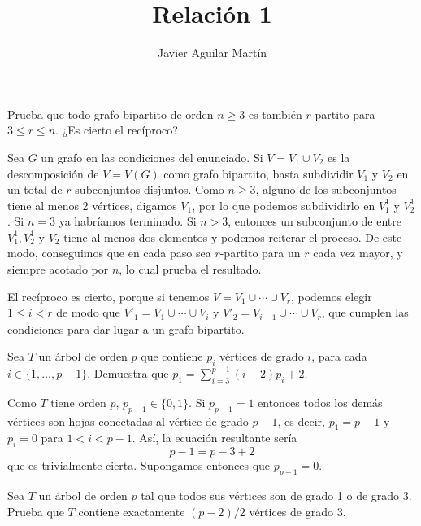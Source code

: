 \documentclass[twoside]{article}
\begin{document}
\title{Relación 1}
\author{Javier Aguilar Martín}
\maketitle


\begin{ejercicio}{1.1}
Prueba que todo grafo bipartito de orden $n \geq 3$ es también $r$-partito para $3\leq r \leq n$. ¿Es
cierto el recíproco?
\end{ejercicio}
\begin{solucion}
Sea $G$ un grafo en las condiciones del enunciado. Si $V=V_1\cup V_2$ es la descomposición de $V=V(G)$ como grafo bipartito, basta subdividir $V_1$ y $V_2$ en un total de $r$ subconjuntos disjuntos. Como $n\geq 3$, alguno de los subconjuntos tiene al menos 2 vértices, digamos $V_1$, por lo que podemos subdividirlo en $V_1^1$ y $V_2^1$. Si $n=3$ ya habríamos terminado. Si $n>3$, entonces un subconjunto de entre $V_1^1, V_2^1$ y $V_2$ tiene al menos dos elementos y podemos reiterar el proceso. De este modo, conseguimos que en cada paso sea $r$-partito para un $r$ cada vez mayor, y siempre acotado por $n$, lo cual prueba el resultado. 

El recíproco es cierto, porque si tenemos $V=V_1\cup\cdots\cup V_r$, podemos elegir $1\leq i< r$ de modo que $V'_1=V_1\cup\cdots\cup V_i$ y $V'_2=V_{i+1}\cup\cdots\cup V_r$, que cumplen las condiciones para dar lugar a un grafo bipartito. 
\end{solucion}

\newpage


\begin{ejercicio}{1.2}
Sea $T$ un árbol de orden $p$ que contiene $p_i$ vértices de grado $i$, para cada $i \in\{1,\dots, p-1\}$. Demuestra que $p_1 =
\sum^{p-1}_{i=3} (i - 2)p_i + 2$.
\end{ejercicio}
\begin{solucion}
Como $T$ tiene orden $p$, $p_{p-1}\in \{0,1\}$. Si $p_{p-1}=1$ entonces todos los demás vértices son hojas conectadas al vértice de grado $p-1$, es decir, $p_1=p-1$ y $p_i=0$ para $1<i<p-1$. Así, la ecuación resultante sería
\[
p-1=p-3+2
\]
que es trivialmente cierta. Supongamos entonces que $p_{p-1}=0$. 

\end{solucion}

\newpage

\begin{ejercicio}{1.3}

Sea $T$ un árbol de orden $p$ tal que todos sus vértices son de grado 1 o de grado 3. Prueba
que $T$ contiene exactamente $(p - 2)/2$ vértices de grado 3.
\end{ejercicio}
\begin{solucion}
\end{solucion}
\end{document}
